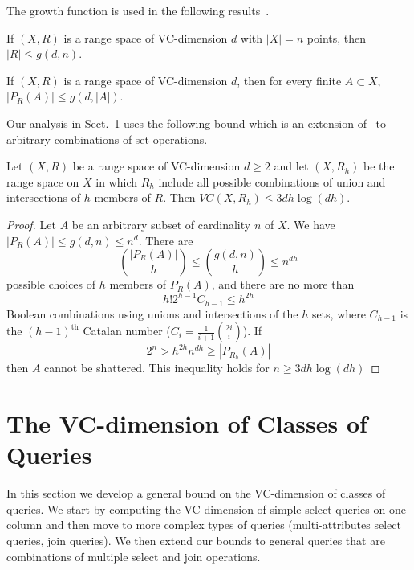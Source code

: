 The growth function is used in the following results~\citep[Sect.~14.4]{AlonS08}.
\begin{lemma}\label{lem:sauer}
  If $(X,R)$ is a range space of VC-dimension $d$ with $|X|=n$ points, then
  $|R|\le g(d,n) $.
\end{lemma}

\begin{corollary}\label{corol:SauerProj}
  If $(X,R)$ is a range space of VC-dimension $d$, then for every finite
  $A\subset X$, $|P_R(A)|\le g(d,|A|)$.
\end{corollary}

Our analysis in Sect.~\ref{sec:vcdimqueries} uses the following bound which is an extension
of~\citep[Corol.~14.4.3]{AlonS08} to arbitrary combinations of set operations.

\begin{lemma}\label{lem:genboolcomp}
   Let $(X,R)$ be a range space of VC-dimension $d\ge 2$ and let $(X,R_h)$ be the
  range space on $X$ in which $R_h$ include all possible combinations of 
    union and intersections of $h$ members of $R$. Then $VC(X,R_h)\le
  3dh\log(dh)$.
\end{lemma}

\begin{proof}
  Let $A$ be an arbitrary subset of cardinality $n$ of $X$. We have $|P_R(A)|\le
  g(d,n) \le n^d$. There are 
  \[
  \binom{|P_R(A)|}{h}\le \binom{g(d,n)}{h}\le n^{dh} \]
  possible choices of $h$ members of $P_R(A)$, and there are no more
  than 
  \[
  h! 2^{h-1} C_{h-1}\leq h^{2h} \]
  Boolean combinations using unions and intersections of the $h$ sets, where
  $C_{h-1}$ is the $(h-1)^{\mathrm{th}}$ Catalan number
  ($C_i=\frac{1}{i+1}\binom{2i}{i}$). If 
  \[ 
  2^n> h^{2h}n^{dh} \geq |P_{R_h}(A)|\]
  then $A$ cannot be shattered. This inequality holds for $n\ge 3dh\log(dh)$
\end{proof}

\section{The VC-dimension of Classes of Queries}\label{sec:vcdimqueries}
In this section we develop a general bound on the VC-dimension of classes of
queries. We start by computing the VC-dimension of simple select queries on one
column and then move to more complex types of queries (multi-attributes select
queries, join queries). We then extend our bounds to general queries that are
combinations of multiple select and join operations.

